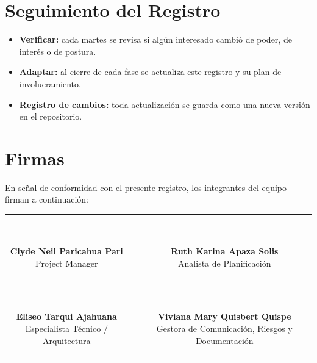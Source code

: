 \documentclass[11pt,a4paper]{article}
\begin{document}
\section{Seguimiento del Registro}
\begin{itemize}[leftmargin=*]
    \item \textbf{Verificar:} cada martes se revisa si algún interesado cambió de poder, de interés o de postura.
    \item \textbf{Adaptar:} al cierre de cada fase se actualiza este registro y su plan de involucramiento.
    \item \textbf{Registro de cambios:} toda actualización se guarda como una nueva versión en el repositorio.
\end{itemize}

\section{Firmas}
\noindent En señal de conformidad con el presente registro, los integrantes del equipo firman a continuación:

\vspace{1.5cm}
\begin{center}
\begin{tabular}{c c c}
    \parbox{6.5cm}{\centering \rule{6.0cm}{0.6pt}\\[5pt] \textbf{Clyde Neil Paricahua Pari}\\[2pt] {\footnotesize Project Manager}}
    & \hspace{0.8cm} &
    \parbox{6.5cm}{\centering \rule{6.0cm}{0.6pt}\\[5pt] \textbf{Ruth Karina Apaza Solis}\\[2pt] {\footnotesize Analista de Planificación}}
    \\[2.0cm]
    \parbox{6.5cm}{\centering \rule{6.0cm}{0.6pt}\\[5pt] \textbf{Eliseo Tarqui Ajahuana}\\[2pt] {\footnotesize Especialista Técnico / Arquitectura}}
    & \hspace{0.8cm} &
    \parbox{6.5cm}{\centering \rule{6.0cm}{0.6pt}\\[5pt] \textbf{Viviana Mary Quisbert Quispe}\\[2pt] {\footnotesize Gestora de Comunicación, Riesgos y Documentación}}
\end{tabular}
\end{center}
\end{document}
